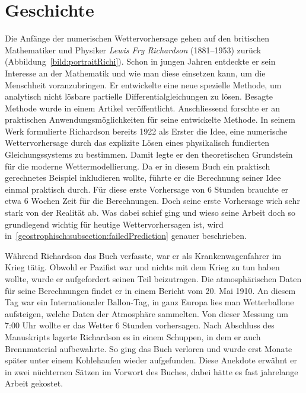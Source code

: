 %
%
%
%
\section{Geschichte\label{geostrophisch:section:geschichte}}

Die Anfänge der numerischen Wettervorhersage gehen auf den britischen Mathematiker und Physiker \emph{Lewis Fry Richardson} (1881–1953) zurück (Abbildung~\ref{bild:portraitRichi}).
Schon in jungen Jahren entdeckte er sein Interesse an der Mathematik und wie man diese einsetzen kann, um die Menschheit voranzubringen.
Er entwickelte eine neue spezielle Methode, um analytisch nicht lösbare partielle Differentialgleichungen zu lösen. 
Besagte Methode wurde in einem Artikel veröffentlicht.
Anschliessend forschte er an praktischen Anwendungsmöglichkeiten für seine entwickelte Methode.
In seinem Werk \cite{geostrophisch:wpbnp} formulierte Richardson bereits 1922 als Erster die Idee, eine numerische Wettervorhersage durch das explizite Lösen eines physikalisch fundierten Gleichungssystems zu bestimmen.  
Damit legte er den theoretischen Grundstein für die moderne Wettermodellierung.
Da er in diesem Buch ein praktisch gerechnetes Beispiel inkludieren wollte, führte er die Berechnung seiner Idee einmal praktisch durch.
Für diese erste Vorhersage von 6 Stunden brauchte er etwa 6 Wochen Zeit für die Berechnungen.
Doch seine erste Vorhersage wich sehr stark von der Realität ab.
Was dabei schief ging und wieso seine Arbeit doch so grundlegend wichtig für heutige Wettervorhersagen ist, wird in~\ref{geostrophisch:subsection:failedPrediction} genauer beschrieben.

Während Richardson das Buch \cite{geostrophisch:wpbnp} verfasste, war er als Krankenwagenfahrer im Krieg tätig. 
Obwohl er Pazifist war und nichts mit dem Krieg zu tun haben wollte, wurde er aufgefordert seinen Teil beizutragen. 
Die atmosphärischen Daten für seine Berechnungen findet er in einem Bericht vom 20. Mai 1910. 
An diesem Tag war ein \glqq Internationaler Ballon-Tag\grqq, in ganz Europa lies man Wetterballone aufsteigen, welche Daten der Atmosphäre sammelten.
Von dieser Messung um 7:00 Uhr wollte er das Wetter 6 Stunden vorhersagen. 
Nach Abschluss des Manuskripts lagerte Richardson es in einem Schuppen, in dem er auch Brennmaterial aufbewahrte.
So ging das Buch verloren und wurde erst Monate später unter einem Kohlehaufen wieder aufgefunden.
Diese Anekdote erwähnt er in zwei nüchternen Sätzen im Vorwort des Buches, dabei hätte es fast jahrelange Arbeit gekostet. 

